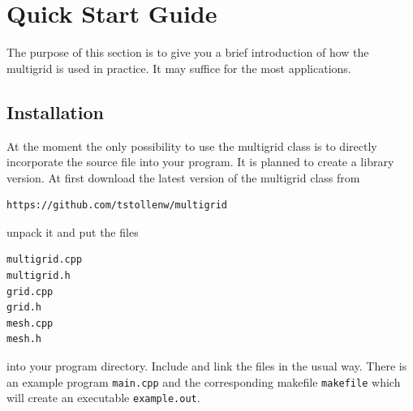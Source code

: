 \chapter{Quick Start Guide}\label{chapter:quick_start_guide}
The purpose of this section is to give you a brief introduction of how the multigrid is used in practice. It may suffice for the most applications.

\section{Installation}
At the moment the only possibility to use the multigrid class is to directly incorporate the source file into your program. It is planned to create a library version. At first download the latest version of the multigrid class from
\begin{lstlisting}[language=bash]
https://github.com/tstollenw/multigrid
\end{lstlisting}
unpack it and put the files
\begin{lstlisting}
multigrid.cpp
multigrid.h
grid.cpp
grid.h
mesh.cpp
mesh.h
\end{lstlisting}
into your program directory. Include and link the files in the usual way. There is an example program \texttt{main.cpp} and the corresponding makefile \texttt{makefile} which will create an executable \texttt{example.out}.

